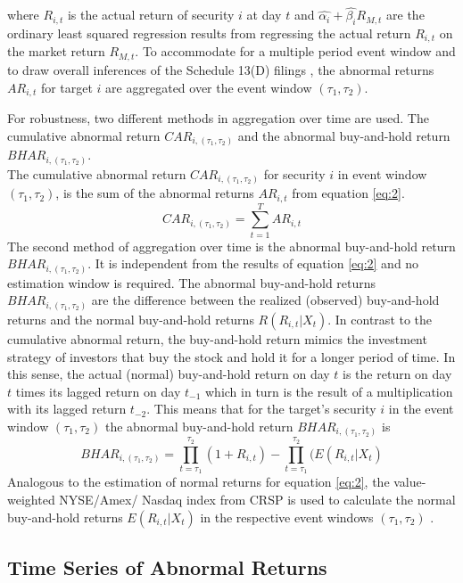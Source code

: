 \documentclass[12pt]{article}
\begin{document}
where $R_{i,t}$ is the actual return of security $i$ at day $t$ and $\hat{\alpha_{i}}+\hat{\beta_{i}}R_{M,t}$ are the ordinary least squared regression results from regressing the actual return $R_{i,t}$ on the market return $R_{M,t}$. To accommodate for a multiple period event window and to draw overall inferences of the Schedule 13(D) filings \citep[p.21]{MacKinlay1997}, the abnormal returns $AR_{i,t}$ for target $i$ are aggregated over the event window $(\tau_1,\tau_2)$.\par
For robustness, two different methods in aggregation over time are used. The cumulative abnormal return $CAR_{i,(\tau_1,\tau_2)}$ and the abnormal buy-and-hold return $BHAR_{i,(\tau_1,\tau_2)}$.\\
The cumulative abnormal return $CAR_{i,(\tau_1,\tau_2)}$ for security $i$ in event window $(\tau_1,\tau_2)$, is the sum of the abnormal returns $AR_{i,t}$ from equation \eqref{eq:2}.
	\begin{equation}
		CAR_{i,(\tau_1,\tau_2)}=\sum_{t=1}^{T}AR_{i,t}
	\end{equation}
The second method of aggregation over time is the abnormal buy-and-hold return $BHAR_{i,(\tau_1,\tau_2)}$. It is independent from the results of equation \eqref{eq:2} and no estimation window is required. 
The abnormal buy-and-hold returns $BHAR_{i,(\tau_1,\tau_2)}$ are the difference between the realized (observed) buy-and-hold returns and the normal buy-and-hold returns $R(R_{i,t}|X_{t})$.
In contrast to the cumulative abnormal return, the buy-and-hold return mimics the investment strategy of investors that buy the stock and hold it for a longer period of time. In this sense, the actual (normal) buy-and-hold return on day $t$ is the return on day $t$ times its lagged return on day $t_{-1}$ which in turn is the result of a multiplication with its lagged return $t_{-2}$. This means that for the target's security $i$ in the event window $(\tau_1,\tau_2)$ the abnormal buy-and-hold return $BHAR_{i,(\tau_1,\tau_2)}$ is
\begin{equation}
	BHAR_{i,(\tau_1,\tau_2)}=\prod_{t=\tau_1}^{\tau_2}(1+R_{i,t})-\prod_{t=\tau_1}^{\tau_2}(E(R_{i,t}|X_{t})
\end{equation}
Analogous to the estimation of normal returns for equation \eqref{eq:2}, the value-weighted NYSE/Amex/ Nasdaq index from CRSP is used to calculate the normal buy-and-hold returns $E(R_{i,t}|X_{t})$ in the respective event windows $(\tau_1,\tau_2)$ \citep[p.25]{Brav2009}.

\subsection{Time Series of Abnormal Returns}
\end{document}

